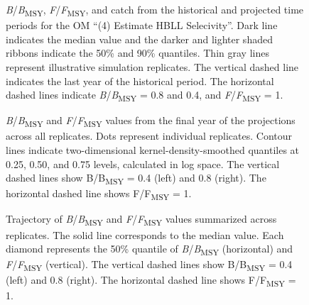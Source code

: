 \documentclass[11pt]{book}
\begin{document}
\begin{figure}[htb]

{\centering {} 

}

\caption{\emph{B}/\emph{B}\textsubscript{MSY}, \emph{F}/\emph{F}\textsubscript{MSY}, and catch from the historical and projected time periods for the OM ``(4) Estimate HBLL Selecivity''. Dark line indicates the median value and the darker and lighter shaded ribbons indicate the 50\% and 90\% quantiles. Thin gray lines represent illustrative simulation replicates. The vertical dashed line indicates the last year of the historical period. The horizontal dashed lines indicate \emph{B}/\emph{B}\textsubscript{MSY} = 0.8 and 0.4, and \emph{F}/\emph{F}\textsubscript{MSY} = 1.}\label{fig:proj-upweight-dogfish}
\end{figure}
\clearpage


\begin{figure}[htb]

{\centering {} 

}

\caption{\emph{B}/\emph{B}\textsubscript{MSY} and \emph{F}/\emph{F}\textsubscript{MSY} values from the final year of the projections across all replicates. Dots represent individual replicates. Contour lines indicate two-dimensional kernel-density-smoothed quantiles at 0.25, 0.50, and 0.75 levels, calculated in log space. The vertical dashed lines show B/B\textsubscript{MSY} = 0.4 (left) and 0.8 (right). The horizontal dashed line shows F/F\textsubscript{MSY} = 1.}\label{fig:kobe}
\end{figure}
\clearpage


\begin{figure}[htb]

{\centering {} 

}

\caption{Trajectory of \emph{B}/\emph{B}\textsubscript{MSY} and \emph{F}/\emph{F}\textsubscript{MSY} values summarized across replicates. The solid line corresponds to the median value. Each diamond represents the 50\% quantile of \emph{B}/\emph{B}\textsubscript{MSY} (horizontal) and \emph{F}/\emph{F}\textsubscript{MSY} (vertical). The vertical dashed lines show B/B\textsubscript{MSY} = 0.4 (left) and 0.8 (right). The horizontal dashed line shows F/F\textsubscript{MSY} = 1.}\label{fig:worm}
\end{figure}
\clearpage
\end{document}
